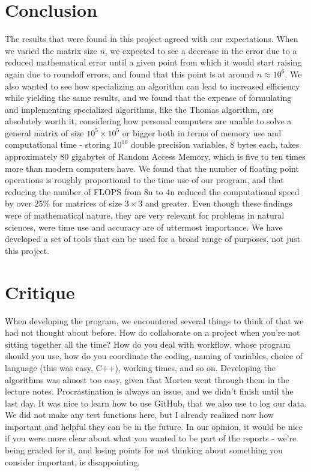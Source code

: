\documentclass[10pt,a4paper]{article}
\begin{document}
\section{Conclusion}
The results that were found in this project agreed with our expectations. When we varied the matrix size $n$, we expected to see a decrease in the error due to a reduced mathematical error until a given point from which it would start raising again due to roundoff errors, and found that this point is at around $n \approx 10^6$. We also wanted to see how specializing an algorithm can lead to increased efficiency while yielding the same results, and we found that the expense of formulating and implementing specialized algorithms, like the Thomas algorithm, are absolutely worth it, considering how personal computers are unable to solve a general matrix of size $10^5\times10^5$ or bigger both in terms of memory use and computational time - storing $10^{10}
$ double precision variables, 8 bytes each, takes approximately 80 gigabytes of Random Access Memory, which is five to ten times more than modern computers have. We found that the number of floating point operations is roughly proportional to the time use of our program, and that reducing the number of FLOPS from 8n to 4n reduced the computational speed by over 25\% for matrices of size $3\times 3$ and greater. Even though these findings were of mathematical nature, they are very relevant for problems in natural sciences, were time use and accuracy are of uttermost importance. We have developed a set of tools that can be used for a broad range of purposes, not just this project.
\section{Critique}
When developing the program, we encountered several things to think of that we had not thought about before. How do collaborate on a project when you're not sitting together all the time? How do you deal with workflow, whose program should you use, how do you coordinate the coding, naming of variables, choice of language (this was easy, C++), working times, and so on. Developing the algorithms was almost too easy, given that Morten went through them in the lecture notes. Procrastination is always an issue, and we didn't finish until the last day. It was nice to learn how to use GitHub, that we also use to log our data. We did not make any test functions here, but I already realized now how important and helpful they can be in the future. In our opinion, it would be nice if you were more clear about what you wanted to be part of the reports - we're being graded for it, and losing points for not thinking about something you consider important, is disappointing.
\end{document}
